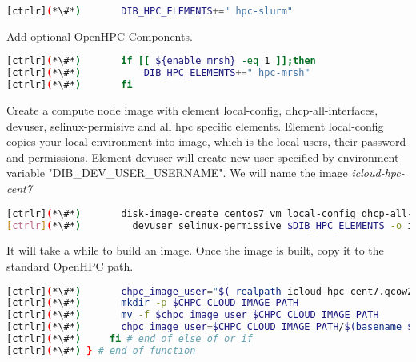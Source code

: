 
\begin{lstlisting}[language=bash,keywords={}]
[ctrlr](*\#*)       DIB_HPC_ELEMENTS+=" hpc-slurm"
\end{lstlisting} 

	Add optional OpenHPC Components.


\begin{lstlisting}[language=bash,keywords={}]
[ctrlr](*\#*)       if [[ ${enable_mrsh} -eq 1 ]];then
[ctrlr](*\#*)           DIB_HPC_ELEMENTS+=" hpc-mrsh"
[ctrlr](*\#*)       fi
\end{lstlisting} 

	Create a compute node image with element local-config, dhcp-all-interfaces, devuser, selinux-permisive and all hpc specific elements. Element local-config copies your local environment into image, which is the local users, their password and permissions. Element devuser will create new user specified by environment variable "DIB\_DEV\_USER\_USERNAME". We will name the image {\em  icloud-hpc-cent7 }


\begin{lstlisting}[language=bash,keywords={}]
[ctrlr](*\#*)       disk-image-create centos7 vm local-config dhcp-all-interfaces \
[ctrlr](*\#*)         devuser selinux-permissive $DIB_HPC_ELEMENTS -o icloud-hpc-cent7
\end{lstlisting} 


	It will take a while to build an image. Once the image is built, copy it to the standard OpenHPC path.


\begin{lstlisting}[language=bash,keywords={}]
[ctrlr](*\#*)       chpc_image_user="$( realpath icloud-hpc-cent7.qcow2)"
[ctrlr](*\#*)       mkdir -p $CHPC_CLOUD_IMAGE_PATH
[ctrlr](*\#*)       mv -f $chpc_image_user $CHPC_CLOUD_IMAGE_PATH
[ctrlr](*\#*)       chpc_image_user=$CHPC_CLOUD_IMAGE_PATH/$(basename $chpc_image_user)
[ctrlr](*\#*)     fi # end of else of or if
[ctrlr](*\#*) } # end of function
\end{lstlisting} 

